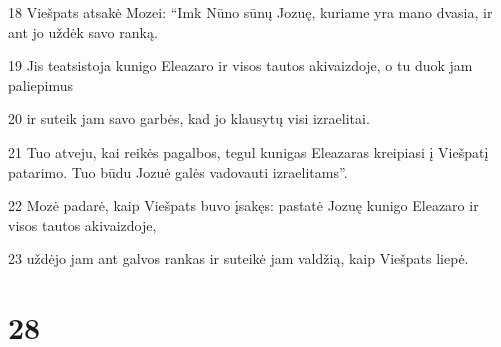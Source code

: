 \par 18 Viešpats atsakė Mozei: “Imk Nūno sūnų Jozuę, kuriame yra mano dvasia, ir ant jo uždėk savo ranką. 
\par 19 Jis teatsistoja kunigo Eleazaro ir visos tautos akivaizdoje, o tu duok jam paliepimus 
\par 20 ir suteik jam savo garbės, kad jo klausytų visi izraelitai. 
\par 21 Tuo atveju, kai reikės pagalbos, tegul kunigas Eleazaras kreipiasi į Viešpatį patarimo. Tuo būdu Jozuė galės vadovauti izraelitams”. 
\par 22 Mozė padarė, kaip Viešpats buvo įsakęs: pastatė Jozuę kunigo Eleazaro ir visos tautos akivaizdoje, 
\par 23 uždėjo jam ant galvos rankas ir suteikė jam valdžią, kaip Viešpats liepė.



\chapter{28}

